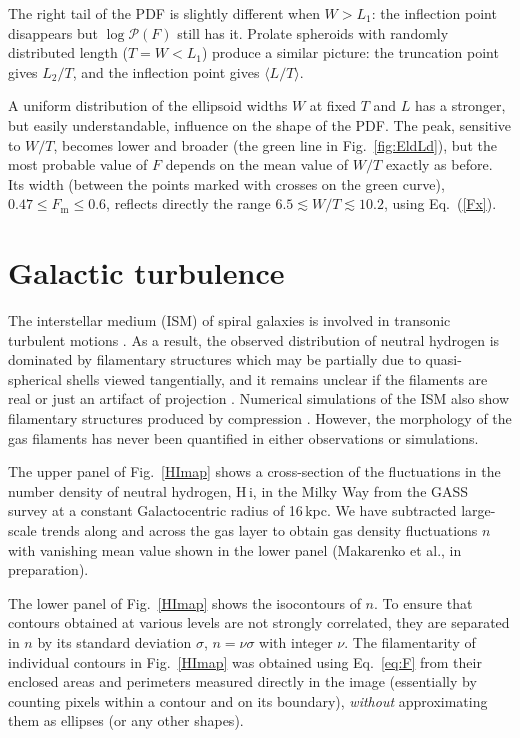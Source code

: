 \documentclass[useAMS,usenatbib]{mn2e}
\newcommand{\mx}{_\mathrm{m}}%
\begin{document}
The right tail of the PDF is slightly different when $W>L_1$: the inflection
point disappears but $\log{\mathcal P}(F)$ still has it. Prolate spheroids
with randomly distributed length ($T = W < L_1$) produce a similar picture:
the truncation point gives $L_2/T$, and the inflection point gives $\langle
L/T \rangle$.

A uniform distribution of the ellipsoid widths $W$ at fixed $T$ and $L$ has a
stronger, but easily understandable, influence on the shape of the PDF. The
peak, sensitive to $W/T$, becomes lower and broader  (the green line in
Fig.~\ref{fig:EldLd}), but the most probable value of $F$ depends on the mean
value of $W/T$ exactly as before. Its width (between the points marked with
crosses on the green curve), $0.47 \leq F\mx \leq 0.6$, reflects directly the
range $6.5 \lesssim W/T \lesssim 10.2$, using Eq.~(\ref{Fx}).

\section{Galactic turbulence}\label{GT}
The interstellar medium (ISM) of spiral galaxies is involved in transonic
turbulent motions \citep{ES04,SE04}. As a result, the observed distribution of
neutral hydrogen is dominated by filamentary structures which may be partially
due to quasi-spherical shells viewed tangentially, and it remains unclear if
the filaments are real or just an artifact of projection \citep{KH88}.
Numerical simulations of the ISM also show filamentary structures produced by
compression \citep{B-PV-SS99,KBSTN99}. However, the morphology of the gas
filaments has never been quantified in either observations or simulations.

The upper panel of Fig.~\ref{HImap} shows a cross-section of the fluctuations
in the number density of neutral hydrogen, H\,{\sc i}, in the Milky Way from
the GASS survey \citep{GASS10} at a constant Galactocentric radius of 16\,kpc.
We have subtracted large-scale trends along and across the gas layer to obtain
gas density fluctuations $n$ with vanishing mean value shown in the lower
panel (Makarenko et al., in preparation).

The lower panel of Fig.~\ref{HImap} shows the isocontours of $n$. To ensure
that contours obtained at various levels are not strongly correlated, they are
separated in $n$ by its standard deviation $\sigma$, $n=\nu\sigma$ with
integer $\nu$. The filamentarity of individual contours in Fig.~\ref{HImap}
was obtained using Eq.~\eqref{eq:F} from their enclosed areas and perimeters
measured directly in the image (essentially by counting pixels within a
contour and on its boundary), \textit{without\/} approximating them as
ellipses (or any other shapes).
\end{document}
